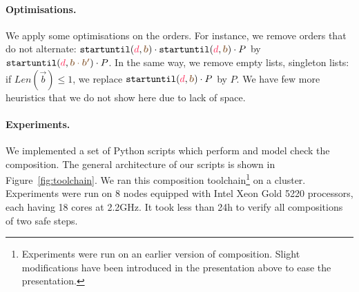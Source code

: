 \documentclass[runningheads]{llncs}
\newcommand{\dirFmt}[1]{{\color{dircolor} #1}}
\newcommand{\posFmt}[1]{{\color{poscolor}{#1}}}
\newcommand{\su}[2]{{\mbox{$\mathtt{startuntil}(\dirFmt{#1}, \posFmt{#2})$}}\xspace}
\begin{document}
\paragraph{Optimisations.} We apply some optimisations on the orders. For instance, we remove orders that do not alternate: $\su{d}{\vec{b}} \cdot \su{d}{\vec{b}} \cdot P$ by $\su{d}{\vec{b} \cdot \vec{b'}} \cdot P$. In the same way,  we remove empty lists, singleton lists: if $Len(\vec{b}) \leq 1$, we replace $\su{d}{\vec{b}} \cdot P$ by $P$. We have few more heuristics that we do not show here due to lack of space. 

\paragraph{Experiments.}
We implemented a set of Python scripts which perform and model check the composition. The general architecture of our scripts is shown in Figure~\ref{fig:toolchain}. We ran this composition toolchain\footnote{Experiments were run on an earlier version of composition. Slight modifications have been introduced in the presentation above to ease the presentation.} on a cluster. Experiments were run on 8 nodes equipped with Intel Xeon Gold 5220 processors, each having 18 cores at 2.2GHz. It took less than 24h to verify all compositions of two safe steps.
\end{document}
